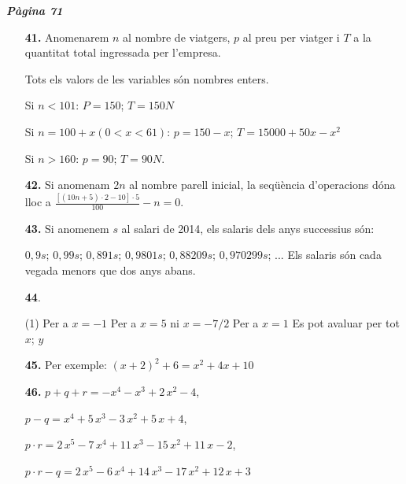 \documentclass[a4paper, pdf, twoside]{book}
\begin{document}
\begin{multicols}{2}
{\textbf{\em Pàgina 71}} \hrulefill
\begin{enumerate}
\vspace{0.25cm}
\item[\fontfamily{phv}\selectfont\color{blue}\textbf{41. }] 
 Anomenarem $n$ al nombre de viatgers, $p$ al preu per viatger i $T$ a la quantitat total ingressada per l'empresa.\par Tots els valors de les variables són nombres enters.\par Si $n <101$: $P = 150$; $T = 150N$\par Si $n = 100 + x (0 <x <61)$: $p = 150 - x$; $T = 15 000 + 50x - x^2$\par Si $n> 160$: $p = 90$; $T = 90N.$
 \end{enumerate}
\begin{enumerate}
\vspace{0.25cm}
\item[\fontfamily{phv}\selectfont\color{blue}\textbf{42. }] 
 Si anomenam $2n$ al nombre parell inicial, la seqüència d'operacions dóna lloc a $\frac {[(10n+5)\cdot 2 -10]\cdot 5}{100}-n = 0$. 
\vspace{0.25cm}
\item[\fontfamily{phv}\selectfont\color{blue}\textbf{43. }] 
 Si anomenem $s$ al salari de 2014, els salaris dels anys successius són:\par $0,9 s$; $0,99 s$; $0,891 s$; $0,9801 s$; $0,88209 s$; $0,970299 s$; ... Els salaris són cada vegada menors que dos anys abans.
\vspace{0.25cm}



 \item[\fontfamily{phv}\selectfont\color{blue}\textbf{44}. ] 
 \begin{tasks}[column-sep=1em, item-indent=1.3333em](1)
	 \task Per a $x=-1$
	 \task Per a $x=5$ ni $x=-7/2$
	 \task Per a $x=1$
	 \task Es pot avaluar per tot $x$; $y$
\end{tasks}
\vspace{0.25cm}
\item[\fontfamily{phv}\selectfont\color{blue}\textbf{45. }] 
Per exemple: $(x+2)^2 + 6 = x^2 + 4x + 10$
\vspace{0.25cm}
\item[\fontfamily{phv}\selectfont\color{blue}\textbf{46. }] 
 $p+q+r=-x^4-x^3+2\,x^2-4$, \par $p-q=x^4+5\,x^3-3\,x^2+5\,x+4$, \par $p\cdot r=2\,x^5-7\,x^4+11\,x^3-15\,x^2+11\,x-2$, \par $p\cdot r-q=2\,x^5-6\,x^4+14\,x^3-17\,x^2+12\,x+3$
 \end{enumerate}
\vspace{0.3cm}


\end{multicols}
\end{document}
